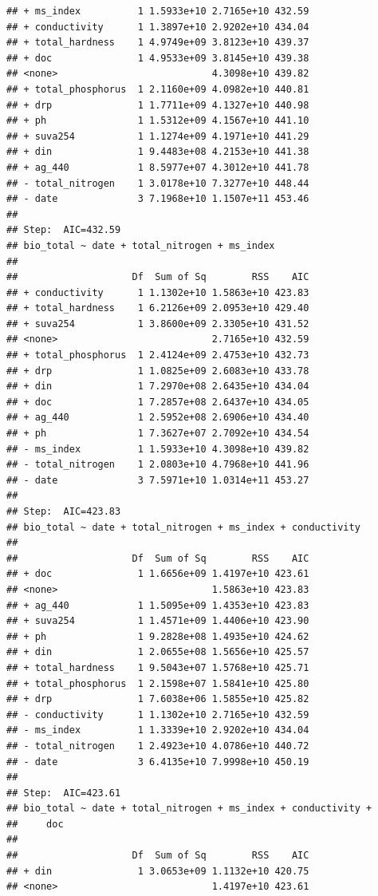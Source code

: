 \documentclass[
]{book}
\begin{document}
\begin{verbatim}
## + ms_index          1 1.5933e+10 2.7165e+10 432.59
## + conductivity      1 1.3897e+10 2.9202e+10 434.04
## + total_hardness    1 4.9749e+09 3.8123e+10 439.37
## + doc               1 4.9533e+09 3.8145e+10 439.38
## <none>                           4.3098e+10 439.82
## + total_phosphorus  1 2.1160e+09 4.0982e+10 440.81
## + drp               1 1.7711e+09 4.1327e+10 440.98
## + ph                1 1.5312e+09 4.1567e+10 441.10
## + suva254           1 1.1274e+09 4.1971e+10 441.29
## + din               1 9.4483e+08 4.2153e+10 441.38
## + ag_440            1 8.5977e+07 4.3012e+10 441.78
## - total_nitrogen    1 3.0178e+10 7.3277e+10 448.44
## - date              3 7.1968e+10 1.1507e+11 453.46
## 
## Step:  AIC=432.59
## bio_total ~ date + total_nitrogen + ms_index
## 
##                    Df  Sum of Sq        RSS    AIC
## + conductivity      1 1.1302e+10 1.5863e+10 423.83
## + total_hardness    1 6.2126e+09 2.0953e+10 429.40
## + suva254           1 3.8600e+09 2.3305e+10 431.52
## <none>                           2.7165e+10 432.59
## + total_phosphorus  1 2.4124e+09 2.4753e+10 432.73
## + drp               1 1.0825e+09 2.6083e+10 433.78
## + din               1 7.2970e+08 2.6435e+10 434.04
## + doc               1 7.2857e+08 2.6437e+10 434.05
## + ag_440            1 2.5952e+08 2.6906e+10 434.40
## + ph                1 7.3627e+07 2.7092e+10 434.54
## - ms_index          1 1.5933e+10 4.3098e+10 439.82
## - total_nitrogen    1 2.0803e+10 4.7968e+10 441.96
## - date              3 7.5971e+10 1.0314e+11 453.27
## 
## Step:  AIC=423.83
## bio_total ~ date + total_nitrogen + ms_index + conductivity
## 
##                    Df  Sum of Sq        RSS    AIC
## + doc               1 1.6656e+09 1.4197e+10 423.61
## <none>                           1.5863e+10 423.83
## + ag_440            1 1.5095e+09 1.4353e+10 423.83
## + suva254           1 1.4571e+09 1.4406e+10 423.90
## + ph                1 9.2828e+08 1.4935e+10 424.62
## + din               1 2.0655e+08 1.5656e+10 425.57
## + total_hardness    1 9.5043e+07 1.5768e+10 425.71
## + total_phosphorus  1 2.1598e+07 1.5841e+10 425.80
## + drp               1 7.6038e+06 1.5855e+10 425.82
## - conductivity      1 1.1302e+10 2.7165e+10 432.59
## - ms_index          1 1.3339e+10 2.9202e+10 434.04
## - total_nitrogen    1 2.4923e+10 4.0786e+10 440.72
## - date              3 6.4135e+10 7.9998e+10 450.19
## 
## Step:  AIC=423.61
## bio_total ~ date + total_nitrogen + ms_index + conductivity + 
##     doc
## 
##                    Df  Sum of Sq        RSS    AIC
## + din               1 3.0653e+09 1.1132e+10 420.75
## <none>                           1.4197e+10 423.61

\end{verbatim}
\end{document}
